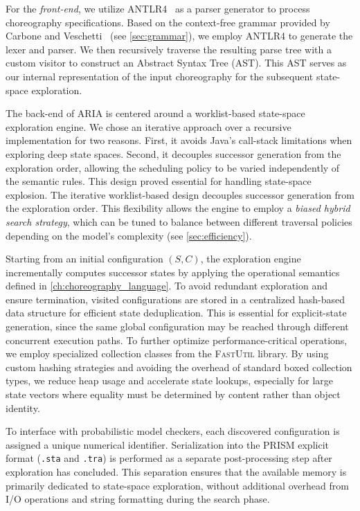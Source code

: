For the \textit{front-end}, we utilize \textsc{ANTLR4}~\cite{antlr4} as a parser generator to process choreography specifications. Based on the context-free grammar provided by Carbone and Veschetti~\cite{CarboneVeschetti} (see \cref{sec:grammar}), we employ \textsc{ANTLR4} to generate the lexer and parser. We then recursively traverse the resulting parse tree with a custom visitor to construct an Abstract Syntax Tree (AST). This AST serves as our internal representation of the input choreography for the subsequent state-space exploration. 

The back-end of ARIA is centered around a worklist-based state-space exploration engine. We chose an iterative approach over a recursive implementation for two reasons. First, it avoids Java’s call-stack limitations when exploring deep state spaces. Second, it decouples successor generation from the exploration order, allowing the scheduling policy to be varied independently of the semantic rules.
This design proved essential for handling state-space explosion. The iterative worklist-based design decouples successor generation from the exploration order. This flexibility allows the engine to employ a \textit{biased hybrid search strategy}, which can be tuned to balance between different traversal policies depending on the model's complexity (see \cref{sec:efficiency}).

Starting from an initial configuration $(S,C)$, the exploration engine incrementally computes successor states by applying the operational semantics defined in \cref{ch:choreography_language}. To avoid redundant exploration and ensure termination, visited configurations are stored in a centralized hash-based data structure for efficient state deduplication. This is essential for explicit-state generation, since the same global configuration may be reached through different concurrent execution paths. To further optimize performance-critical operations, we employ specialized collection classes from the \textsc{FastUtil} library. By using custom hashing strategies and avoiding the overhead of standard boxed collection types, we reduce heap usage and accelerate state lookups, especially for large state vectors where equality must be determined by content rather than object identity.

To interface with probabilistic model checkers, each discovered configuration is assigned a unique numerical identifier. Serialization into the PRISM explicit format (\texttt{.sta} and \texttt{.tra}) is performed as a separate post-processing step after exploration has concluded. This separation ensures that the available memory is primarily dedicated to state-space exploration, without additional overhead from I/O operations and string formatting during the search phase.

